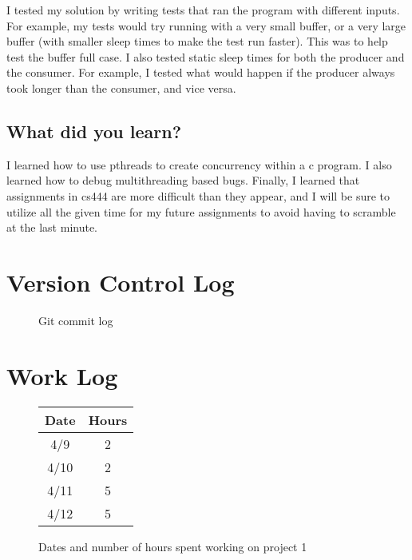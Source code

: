 \documentclass[letterpaper,draftclsnofoot,onecolumn,10pt]{article}
\begin{document}
I tested my solution by writing tests that ran the program with different inputs. For example, my tests would try running with a very small buffer, or a very large buffer (with smaller sleep times to make the test run faster). This was to help test the buffer full case. I also tested static sleep times for both the producer and the consumer. For example, I tested what would happen if the producer always took longer than the consumer, and vice versa.

\subsection{What did you learn?}

I learned how to use pthreads to create concurrency within a c program. I also learned how to debug multithreading based bugs. Finally, I learned that assignments in cs444 are more difficult than they appear, and I will be sure to utilize all the given time for my future assignments to avoid having to scramble at the last minute.

\section{Version Control Log}

\begin{figure}[h]
   
   \caption{Git commit log}
\end{figure}

\section{Work Log}

\begin{figure}[h]
   \begin{tabular}{c | c}
      Date & Hours \\
      \hline
      4/9 & 2 \\
      \hline
      4/10 & 2 \\
      \hline
      4/11 & 5 \\
      \hline
      4/12 & 5 \\
   \end{tabular}
   \caption{Dates and number of hours spent working on project 1}
\end{figure}
      
\end{document}
